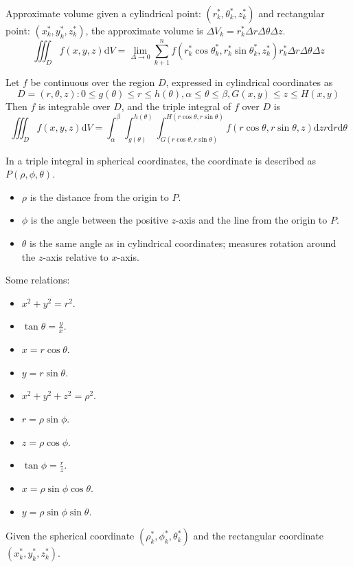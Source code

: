 \documentclass[../calc3.tex]{subfiles}
\begin{document}
Approximate volume given a cylindrical point: $(r_k^*, \theta_k^*, z_k^*)$ and 
rectangular point: $(x_k^*, y_k^*, z_k^*)$, the approximate volume is $\Delta V_k = r^*_k\Delta r\Delta \theta\Delta z$.
\[\iiint_D f(x,y,z)\mathrm{d}V = \lim_{\Delta \to 0}\sum^n_{k+1}f(r_k^*\cos\theta_k^*, r_k^*\sin\theta_k^*, z_k^*)r_k^*\Delta r\Delta\theta \Delta z\]

\begin{theorem}
    Let $f$ be continuous over the region $D$, expressed in cylindrical coordinates as 
    \[D={(r,\theta,z):0\leq g(\theta)\leq r\leq h(\theta), \alpha\leq\theta\leq\beta, G(x,y)\leq z\leq H(x,y)}\]
    Then $f$ is integrable over $D$, and the triple integral of $f$ over $D$ is 
    \[\iiint_D f(x,y,z)\mathrm{d}V = \int_{\alpha}^{\beta}\int_{g(\theta)}^{h(\theta)}\int_{G(r\cos\theta, r\sin\theta)}^{H(r\cos\theta, r\sin\theta)}f(r\cos\theta,r\sin\theta,z)\mathrm{d}zr\mathrm{d}r\mathrm{d}\theta\]
\end{theorem}

In a triple integral in spherical coordinates, the coordinate is described as $P(\rho,\phi,\theta)$.
\begin{itemize}
    \item $\rho$ is the distance from the origin to $P$.
    \item $\phi$ is the angle between the positive $z$-axis and the line from the origin to $P$.
    \item $\theta$ is the same angle as in cylindrical coordinates; measures rotation around the $z$-axis relative to $x$-axis.
\end{itemize}

Some relations:
\begin{itemize}
    \item $x^2+y^2=r^2$.
    \item $\tan\theta = \frac{y}{x}$.
    \item $x=r\cos\theta$.
    \item $y=r\sin\theta$.
    \item $x^2+y^2+z^2=\rho^2$.
    \item $r=\rho\sin\phi$.
    \item $z=\rho\cos\phi$.
    \item $\tan\phi = \frac{r}{z}$.
    \item $x=\rho\sin\phi\cos\theta$.
    \item $y=\rho\sin\phi\sin\theta$.
\end{itemize}

Given the spherical coordinate $(\rho_k^*,\phi_k^*,\theta_k^*)$ and the rectangular coordinate $(x_k^*,y_k^*,z_k^*)$.
\end{document}
